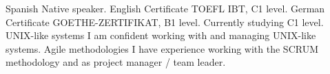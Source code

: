 \begin{cvskills}
    \cvskill
        {Spanish}
        {Native speaker.}
    \cvskill
        {English}
        {Certificate TOEFL IBT, C1 level.}
    \cvskill
        {German}
        {Certificate GOETHE-ZERTIFIKAT, B1 level. Currently studying C1 level.}
    \cvskill
        {UNIX-like systems}
        {I am confident working with and managing UNIX-like systems.}
    \cvskill
        {Agile methodologies}
        {I have experience working with the SCRUM methodology and as project manager / team leader.}
\end{cvskills}
